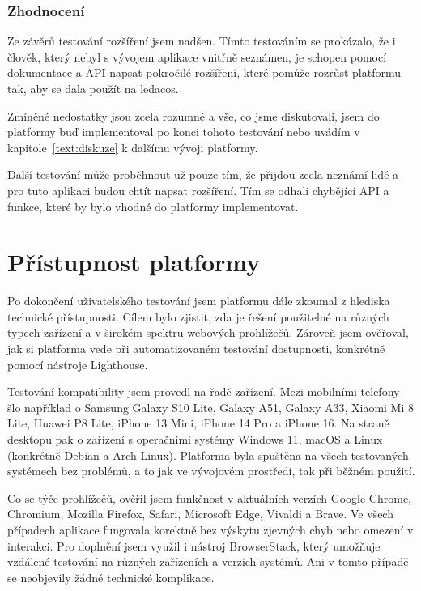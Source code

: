 \subsubsection{Zhodnocení}

Ze závěrů testování rozšíření jsem nadšen.
Tímto testováním se prokázalo, že i člověk, který nebyl s vývojem aplikace vnitřně seznámen, je schopen pomocí dokumentace a API napsat pokročilé rozšíření, které pomůže rozrůst platformu tak, aby se dala použít na ledacos.

Zmíněné nedostatky jsou zcela rozumné a vše, co jsme diskutovali, jsem do platformy buď implementoval po konci tohoto testování nebo uvádím v kapitole~\ref{text:diskuze} k dalšímu vývoji platformy.

Další testování může proběhnout už pouze tím, že přijdou zcela neznámí lidé a pro tuto aplikaci budou chtít napsat rozšíření.
Tím se odhalí chybějící API a funkce, které by bylo vhodné do platformy implementovat.


\section{Přístupnost platformy}

Po dokončení uživatelského testování jsem platformu dále zkoumal z hlediska technické přístupnosti. 
Cílem bylo zjistit, zda je řešení použitelné na různých typech zařízení a v širokém spektru webových prohlížečů. 
Zároveň jsem ověřoval, jak si platforma vede při automatizovaném testování dostupnosti, konkrétně pomocí nástroje Lighthouse.

Testování kompatibility jsem provedl na řadě zařízení. 
Mezi mobilními telefony šlo například o Samsung Galaxy S10 Lite, Galaxy A51, Galaxy A33, Xiaomi Mi 8 Lite, Huawei P8 Lite, iPhone 13 Mini, iPhone 14 Pro a iPhone 16. 
Na straně desktopu pak o zařízení s operačními systémy Windows 11, macOS a Linux (konkrétně Debian a Arch Linux). 
Platforma byla spuštěna na všech testovaných systémech bez problémů, a to jak ve vývojovém prostředí, tak při běžném použití.

Co se týče prohlížečů, ověřil jsem funkčnost v aktuálních verzích Google Chrome, Chromium, Mozilla Firefox, Safari, Microsoft Edge, Vivaldi a Brave. 
Ve všech případech aplikace fungovala korektně bez výskytu zjevných chyb nebo omezení v interakci. 
Pro doplnění jsem využil i nástroj BrowserStack, který umožňuje vzdálené testování na různých zařízeních a verzích systémů. Ani v tomto případě se neobjevily žádné technické komplikace.

